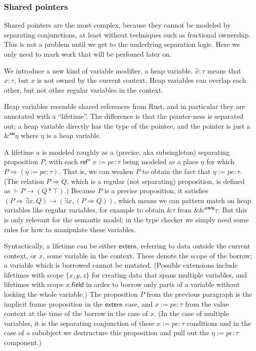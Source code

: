 \documentclass[acmsmall,nonacm]{acmart}
\begin{document}
\subsubsection{Shared pointers}

Shared pointers are the most complex, because they cannot be modeled by separating conjunctions, at least without techniques such as fractional ownership. This is not a problem until we get to the underlying separation logic. Here we only need to mark work that will be perfomed later on.

We introduce a new kind of variable modifier, a heap variable. $\hat x:\tau$ means that $x:\tau$, but $x$ is not owned by the current context. Heap variables can overlap each other, but not other regular variables in the context.

Heap variables resemble shared references from Rust, and in particular they are annotated with a ``lifetime''. The difference is that the pointer-ness is separated out; a heap variable directly has the type of the pointee, and the pointer is just a $\&^\mathbf{sn}\eta$ where $\eta$ is a heap variable.

A lifetime $a$ is modeled roughly as a (precise, aka subsingleton) separating proposition $P$, with each $\mathsf{ref}^a\;x:=pe:\tau$ being modeled as a place $\eta$ for which $P\Rightarrow (\eta:=pe:\tau)$. That is, we can weaken $P$ to obtain the fact that $\eta:=pe:\tau$. (The relation $P\Rightarrow Q$, which is a regular (not separating) proposition, is defined as $\vdash P\to (Q*\top)$.) Because $P$ is a precise proposition, it satisfies $(P\Rightarrow \exists x, Q)\to (\exists x,(P\Rightarrow Q))$, which means we can pattern match on heap variables like regular variables, for example to obtain $\&\tau$ from $\&\&^\mathbf{own}\tau$. But this is only relevant for the semantic model; in the type checker we simply need some rules for how to manipulate these variables.

Syntactically, a lifetime can be either $\mathsf{extern}$, referring to data outside the current context, or $x$, some variable in the context. These denote the scope of the borrow; a variable which is borrowed cannot be mutated. (Possible extensions include lifetimes with scope $\{x,y,z\}$ for creating data that spans multiple variables, and lifetimes with scope $x.\mathsf{field}$ in order to borrow only parts of a variable without locking the whole variable.) The proposition $P$ from the previous paragraph is the implicit frame proposition in the $\mathsf{extern}$ case, and $x:=pe:\tau$ from the value context at the time of the borrow in the case of $x$. (In the case of multiple variables, it is the separating conjunction of these $x:=pe:\tau$ conditions and in the case of a subobject we destructure this proposition and pull out the $\eta:=pe:\tau$ component.)
\end{document}

